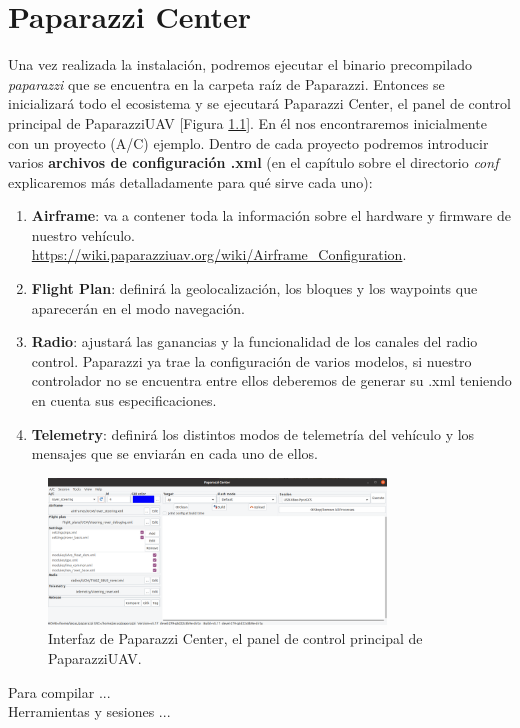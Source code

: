 \chapter{Paparazzi Center}


\noindent Una vez realizada la instalación, podremos ejecutar el binario precompilado \textit{paparazzi} que se encuentra en la carpeta raíz de Paparazzi. Entonces se inicializará todo el ecosistema y se ejecutará Paparazzi Center, el panel de control principal de PaparazziUAV [Figura \ref{fig:cap1_interfaz}]. En él nos encontraremos inicialmente con un proyecto (A/C) ejemplo. Dentro de cada proyecto podremos introducir varios \textbf{archivos de configuración .xml} (en el capítulo sobre el directorio \textit{conf} explicaremos más detalladamente para qué sirve cada uno):

\begin{enumerate}
    \item \textbf{Airframe}: va a contener toda la información sobre el hardware y firmware de nuestro vehículo. \url{https://wiki.paparazziuav.org/wiki/Airframe_Configuration}.
    
    \item \textbf{Flight Plan}: definirá la geolocalización, los bloques y los waypoints que aparecerán en el modo navegación.
    
    \item \textbf{Radio}: ajustará las ganancias y la funcionalidad de los canales del radio control. Paparazzi ya trae la configuración de varios modelos, si nuestro controlador no se encuentra entre ellos deberemos de generar su .xml teniendo en cuenta sus especificaciones.
    
    \item \textbf{Telemetry}: definirá los distintos modos de telemetría del vehículo y los mensajes que se enviarán en cada uno de ellos. 
    
\end{enumerate}

\begin{figure}[h!]
    \centering
    \includegraphics[width=0.8\textwidth]{./figuras/cap1_interfaz.png}
    \caption{Interfaz de Paparazzi Center, el panel de control principal de PaparazziUAV.} \label{fig:cap1_interfaz}
\end{figure}

\newpage

Para compilar ... \\

Herramientas y sesiones ... \\

